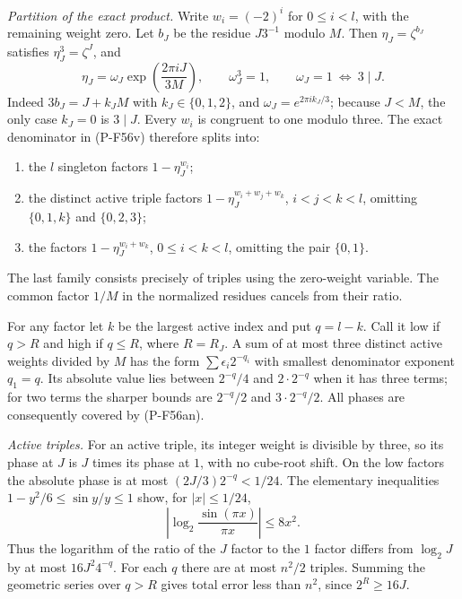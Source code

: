 \documentclass[11pt,a4paper]{article}
\begin{document}
\emph{Partition of the exact product.}
Write $w_i=(-2)^i$ for $0\le i<l$, with the remaining
weight zero. Let $b_J$ be the residue $J3^{-1}$ modulo
$M$. Then $\eta_J=\zeta^{b_J}$ satisfies
$\eta_J^3=\zeta^J$, and
\[
 \eta_J=\omega_J\exp\left(\frac{2\pi iJ}{3M}\right),
 \qquad \omega_J^3=1,
 \qquad \omega_J=1\ \Longleftrightarrow\ 3\mid J.
 \tag{P-F56ap}
\]
Indeed $3b_J=J+k_JM$ with $k_J\in\{0,1,2\}$, and
$\omega_J=e^{2\pi i k_J/3}$; because $J<M$, the only
case $k_J=0$ is $3\mid J$.
Every $w_i$ is congruent to one modulo three. The exact
denominator in (P-F56v) therefore splits into:
\begin{enumerate}
\item the $l$ singleton factors $1-\eta_J^{w_i}$;
\item the distinct active triple factors
      $1-\eta_J^{w_i+w_j+w_k}$, $i<j<k<l$,
      omitting $\{0,1,k\}$ and $\{0,2,3\}$;
\item the factors $1-\eta_J^{w_i+w_k}$,
      $0\le i<k<l$, omitting the pair $\{0,1\}$.
\end{enumerate}
The last family consists precisely of triples using the
zero-weight variable. The common factor $1/M$ in the
normalized residues cancels from their ratio.

For any factor let $k$ be the largest active index and put
$q=l-k$. Call it low if $q>R$ and high if $q\le R$,
where $R=R_J$. A sum of at most three distinct active
weights divided by $M$ has the form
$\sum\epsilon_i2^{-q_i}$ with smallest denominator
exponent $q_1=q$. Its absolute value lies between
$2^{-q}/4$ and $2\cdot2^{-q}$ when it has three terms;
for two terms the sharper bounds are
$2^{-q}/2$ and $3\cdot2^{-q}/2$.
All phases are consequently covered by (P-F56an).

\emph{Active triples.}
For an active triple, its integer weight is divisible
by three, so its phase at $J$ is $J$ times its phase
at $1$, with no cube-root shift. On the low factors
the absolute phase is at most
$(2J/3)2^{-q}<1/24$.
The elementary inequalities
$1-y^2/6\le\sin y/y\le1$ show, for $|x|\le1/24$,
\[
 \left|\log_2\frac{\sin(\pi x)}{\pi x}\right|
                                      \le8x^2.
\]
Thus the logarithm of the ratio of the $J$ factor to
the $1$ factor differs from $\log_2 J$ by at most
$16J^2 4^{-q}$. For each $q$ there are at most
$n^2/2$ triples. Summing the geometric series over
$q>R$ gives total error less than $n^2$, since
$2^R\ge16J$.
\end{document}
